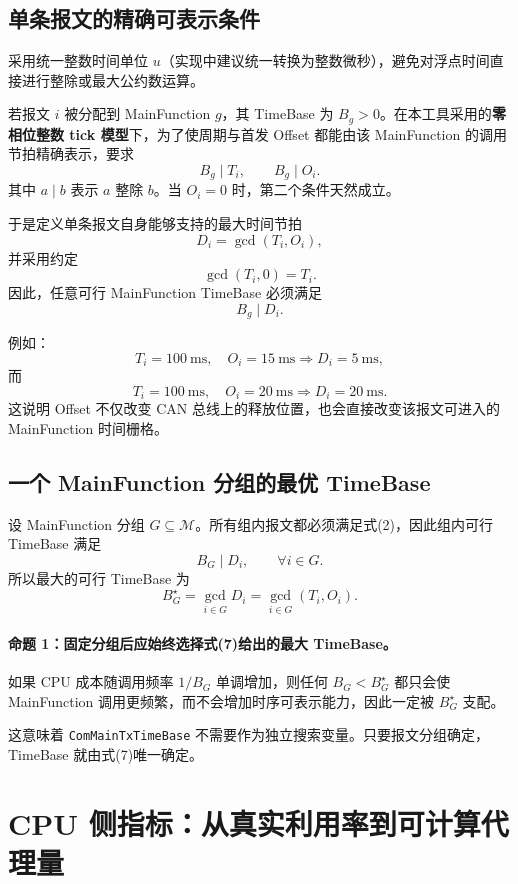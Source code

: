 \documentclass[11pt,a4paper,fontset=none]{ctexart}
\begin{document}
\subsection{单条报文的精确可表示条件}

采用统一整数时间单位 $u$（实现中建议统一转换为整数微秒），避免对浮点时间直接进行整除或最大公约数运算。

若报文 $i$ 被分配到 MainFunction $g$，其 TimeBase 为 $B_g>0$。在本工具采用的\textbf{零相位整数 tick 模型}下，为了使周期与首发 Offset 都能由该 MainFunction 的调用节拍精确表示，要求
\[
B_g\mid T_i,
\qquad
B_g\mid O_i.
\tag{2}
\]
其中 $a\mid b$ 表示 $a$ 整除 $b$。当 $O_i=0$ 时，第二个条件天然成立。

于是定义单条报文自身能够支持的最大时间节拍
\[
D_i=\gcd(T_i,O_i),
\tag{3}
\]
并采用约定
\[
\gcd(T_i,0)=T_i.
\tag{4}
\]
因此，任意可行 MainFunction TimeBase 必须满足
\[
B_g\mid D_i.
\tag{5}
\]

例如：
\[
T_i=100\ \mathrm{ms},\quad O_i=15\ \mathrm{ms}
\Rightarrow D_i=5\ \mathrm{ms},
\]
而
\[
T_i=100\ \mathrm{ms},\quad O_i=20\ \mathrm{ms}
\Rightarrow D_i=20\ \mathrm{ms}.
\]
这说明 Offset 不仅改变 CAN 总线上的释放位置，也会直接改变该报文可进入的 MainFunction 时间栅格。

\subsection{一个 MainFunction 分组的最优 TimeBase}

设 MainFunction 分组 $G\subseteq\mathcal M$。所有组内报文都必须满足式(2)，因此组内可行 TimeBase 满足
\[
B_G\mid D_i,\qquad \forall i\in G.
\tag{6}
\]
所以最大的可行 TimeBase 为
\[
B_G^{\star}
=\gcd_{i\in G}D_i
=\gcd_{i\in G}(T_i,O_i).
\tag{7}
\]

\paragraph{命题 1：固定分组后应始终选择式(7)给出的最大 TimeBase。}
如果 CPU 成本随调用频率 $1/B_G$ 单调增加，则任何 $B_G<B_G^{\star}$ 都只会使 MainFunction 调用更频繁，而不会增加时序可表示能力，因此一定被 $B_G^{\star}$ 支配。

这意味着 \texttt{ComMainTxTimeBase} 不需要作为独立搜索变量。只要报文分组确定，TimeBase 就由式(7)唯一确定。

\section{CPU 侧指标：从真实利用率到可计算代理量}
\end{document}
